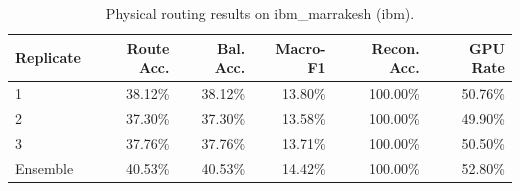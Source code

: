 \begin{table}[t]
\centering
\small
\caption{Physical routing results on ibm_marrakesh (ibm).}
\label{tab:qpu-routing-results}
\begin{tabular}{lrrrrr}
\toprule
Replicate & Route Acc. & Bal. Acc. & Macro-F1 & Recon. Acc. & GPU Rate \\
\midrule
1 & 38.12\% & 38.12\% & 13.80\% & 100.00\% & 50.76\% \\
2 & 37.30\% & 37.30\% & 13.58\% & 100.00\% & 49.90\% \\
3 & 37.76\% & 37.76\% & 13.71\% & 100.00\% & 50.50\% \\
Ensemble & 40.53\% & 40.53\% & 14.42\% & 100.00\% & 52.80\% \\
\bottomrule
\end{tabular}
\end{table}
